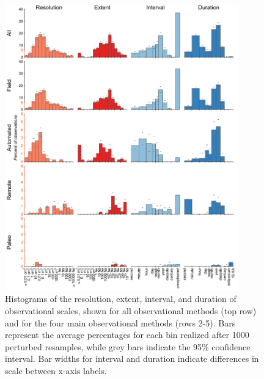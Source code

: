 \documentclass[12pt]{article}
\begin{document}
\begin{figure}[!ht]
\centering
\includegraphics[width=0.9\textwidth]{../vignettes/figures/figS1.png}
\vspace{-5 pt}
\caption{Histograms of the resolution, extent, interval, and duration of observational scales, shown for all observational methods (top row) and for the four main observational methods (rows 2-5). Bars represent the average percentages for each bin realized after 1000 perturbed resamples, while grey bars indicate the 95\% confidence interval. Bar widths for interval and duration indicate differences in scale between x-axis labels. }
\label{obshists}
\end{figure}
\end{document}
